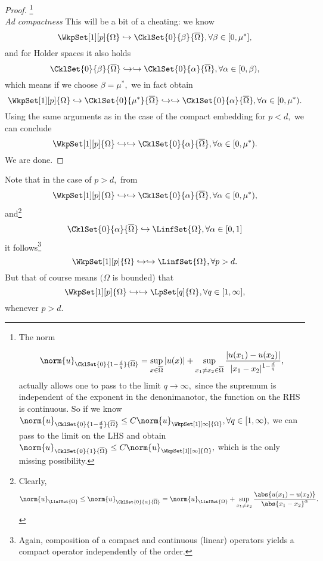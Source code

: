 \begin{proof}
    \footnote{The norm

	    \[
		    \norm{u}_{\CklSet{0}{1- \frac{d}{q}}{\overline{\Omega}}} = \sup_{x \in \overline{\Omega}}|u(x)| + \sup_{x_1 \neq x_2 \in \overline{\Omega}} \frac{|u(x_1) - u(x_2)|}{|x_1 - x_2|^{1- \frac{d}{q}}},
	    \]
    actually allows one to pass to the limit $q \to \infty,$ since the supremum is independent of the exponent in the denonimanotor, the function on the RHS is continuous. So if we know $\norm{u}_{\CklSet{0}{1-\frac{d}{q}}{\overline{\Omega}}}\leq C \norm{u}_{\WkpSet[1][\infty]{\Omega}}, \forall q \in [1, \infty),$ we can pass to the limit on the LHS and obtain $\norm{u}_{\CklSet{0}{1}{\overline{\Omega}}}\leq C \norm{u}_{\WkpSet[1][\infty]{\Omega}},$ which is the only missing possibility.}\\


    \textit{Ad compactness}
    This will be a bit of a cheating: we know
    \[
	    \WkpSet[1][p]{\Omega} \hookrightarrow \CklSet{0}{\beta}{\overline{\Omega}}, \forall \beta \in [0,\mu^{*}],
    \]
    and for Holder spaces it also holds
    \[
	    \CklSet{0}{\beta}{\overline{\Omega}} \hookrightarrow \hookrightarrow \CklSet{0}{\alpha}{\overline{\Omega}}, \forall \alpha \in [0,\beta),
    \]
    which means if we choose $\beta = \mu^{*},$ we in fact obtain
    \[
	    \WkpSet[1][p]{\Omega} \hookrightarrow \CklSet{0}{\mu^{*}}{\overline{\Omega}} \hookrightarrow \hookrightarrow \CklSet{0}{\alpha}{\overline{\Omega}}, \forall \alpha \in [0, \mu^{*}).
    \]
    Using the same arguments as in the case of the compact embedding for $p <d, $ we can conclude
    \[
	    \WkpSet[1][p]{\Omega} \hookrightarrow \hookrightarrow \CklSet{0}{\alpha}{\overline{\Omega}}, \forall \alpha \in [0, \mu^{*}).
    \]
    We are done.
\end{proof}

\begin{remark}
    Note that in the case of $p > d,$ from
    \[
	    \WkpSet[1][p]{\Omega} \hookrightarrow \hookrightarrow \CklSet{0}{\alpha}{\overline{\Omega}}, \forall \alpha \in [0,\mu^{*}),
    \]
    and\footnote{Clearly,
	    \[
		    \norm{u}_{\LinfSet{\Omega}} \leq \norm{u}_{\CklSet{0}{\alpha}{\overline{\Omega}}} = \norm{u}_{\LinfSet{\Omega}} + \sup_{x_1 \neq x_2}\frac{\abs{u(x_1) - u(x_2)}}{\abs{x_1 - x_2}^{\alpha}}.
	    \]
    }
    \[
	    \CklSet{0}{\alpha}{\overline{\Omega}} \hookrightarrow \LinfSet{\Omega}, \forall \alpha \in [0,1]
    \]
    it follows\footnote{Again, composition of a compact and continuous (linear) operators yields a compact operator independently of the order.}
    \[
	    \WkpSet[1][p]{\Omega} \hookrightarrow \hookrightarrow \LinfSet{\Omega}, \forall p > d.
    \]
    But that of course means $(\Omega$ is bounded) that
    \[
	    \WkpSet[1][p]{\Omega} \hookrightarrow \hookrightarrow \LpSet[q]{\Omega}, \forall q \in [1,\infty],
    \]
    whenever $p>d.$
\end{remark}

